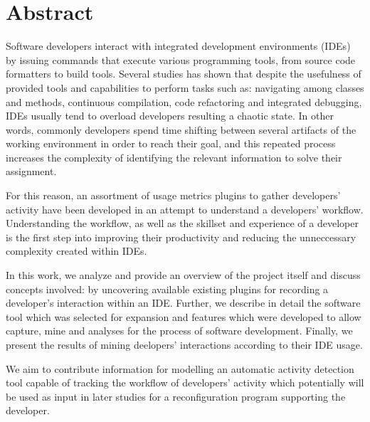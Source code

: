 \chapter{Abstract}


Software developers interact with integrated development environments (IDEs) by issuing commands that execute various programming tools, from source code formatters to build tools. Several studies has shown that despite the usefulness of provided tools and capabilities to perform tasks such as: navigating among classes and methods, continuous compilation, code refactoring and integrated debugging, IDEs usually tend to overload developers resulting a chaotic state. In other words, commonly developers spend time shifting between several artifacts of the working environment in order to reach their goal, and this repeated process increases the complexity of identifying the relevant information to solve their assignment. 

For this reason, an assortment of usage metrics plugins to gather developers' activity have been developed in an attempt to understand a developers' workflow. Understanding the workflow, as well as the skillset and experience of a developer is the first step into improving their productivity and reducing the unneccessary complexity created within IDEs. 

In this work, we analyze and provide an overview of the project itself and discuss concepts involved: by uncovering available existing plugins for recording a developer's interaction within an IDE. Further, we describe in detail the software tool which was selected for expansion and features which were developed to allow capture, mine and analyses for the process of software development. Finally, we present the results of mining deelopers' interactions according to their IDE usage.

We aim to contribute information for modelling an automatic activity detection tool capable of tracking the workflow of developers’ activity which potentially will be used as input in later studies for a reconfiguration program supporting the developer.





